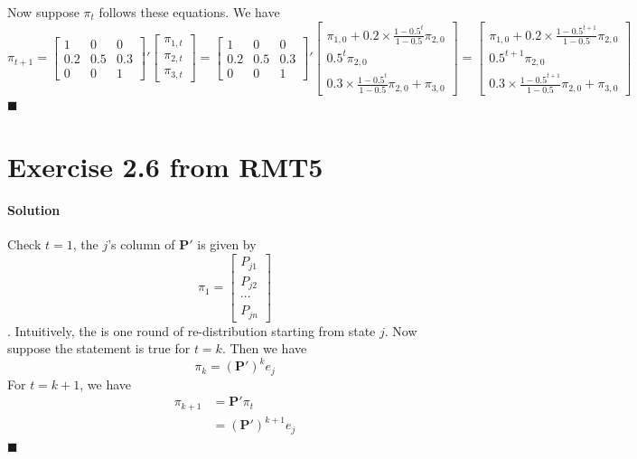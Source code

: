 \documentclass[11pt]{article}
\theoremstyle{definition}
\theoremstyle{boldtitle} %
\numberwithin{equation}{section}
\numberwithin{figure}{section}
\numberwithin{table}{section}
\begin{document}
Now suppose $\pi_t$ follows these equations. 
We have 
\[
\pi_{t+1} =
\left[
\begin{matrix}
  1 & 0 & 0 \\ 0.2 & 0.5 & 0.3 \\ 0 & 0 & 1
\end{matrix}
\right]' 
\left[
\begin{matrix}
  \pi_{1,t} \\ \pi_{2,t} \\ \pi_{3,t}
\end{matrix}
\right] = 
\left[
\begin{matrix}
  1 & 0 & 0 \\ 0.2 & 0.5 & 0.3 \\ 0 & 0 & 1
\end{matrix}
\right]' 
\left[
\begin{matrix}
  \pi_{1,0} + 0.2 \times \frac{1 - 0.5^t}{1 - 0.5} \pi_{2,0} \\ 0.5^t \pi_{2,0} \\ 0.3 \times \frac{1 - 0.5^t}{1 - 0.5} \pi_{2,0} + \pi_{3,0}
\end{matrix}
\right] =
\left[
\begin{matrix}
  \pi_{1,0} + 0.2 \times \frac{1 - 0.5^{t+1}}{1 - 0.5} \pi_{2,0} \\ 0.5^{t+1} \pi_{2,0} \\ 0.3 \times \frac{1 - 0.5^{t+1}}{1 - 0.5} \pi_{2,0} + \pi_{3,0}
\end{matrix}
\right]
\]
\(\blacksquare\)


\section*{Exercise 2.6 from RMT5}
\paragraph{Solution} Check $t=1$, the $j$'s column of $\mathbf{P}'$ is given by
\[
\pi_1 = 
\left[
\begin{matrix}
    P_{j1}  \\ P_{j2} \\ \cdots \\ P_{jn}
\end{matrix}
\right]
\].
Intuitively, the is one round of re-distribution starting from state $j$.
Now suppose the statement is true for $t=k$.
Then we have
\[\pi_k = (\mathbf{P}')^{k} e_j\]
For $t = k+1$, we have 
\begin{align*}
\pi_{k+1} & = \mathbf{P}' \pi_t \\ 
    & = (\mathbf{P}')^{k+1} e_j
\end{align*}
\(\blacksquare\)
\end{document}

